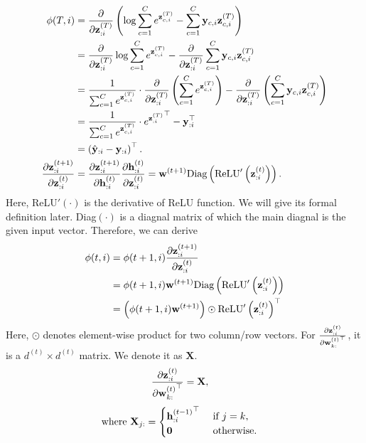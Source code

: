 \documentclass{article}
\begin{document}
\begin{align}
    \phi(T, i) &= {\frac{\partial}{\partial\mathbf{z}^{(T)}_{:i}}\left(\log{\sum_{c = 1}^{C}{e^{\mathbf{z}^{(T)}_{c, i}}}} - \sum_{c = 1}^{C}{\mathbf{y}_{c, i}\mathbf{z}^{(T)}_{c, i}}\right)} \notag \\
    &= {\frac{\partial}{\partial\mathbf{z}^{(T)}_{:i}}\log{\sum_{c = 1}^{C}{e^{\mathbf{z}^{(T)}_{c, i}}}}} - {\frac{\partial}{\partial\mathbf{z}^{(T)}_{:i}}\sum_{c = 1}^{C}{\mathbf{y}_{c, i}\mathbf{z}^{(T)}_{c, i}}} \notag \\
    &= \frac{1}{\sum_{c = 1}^{C}{e^{\mathbf{z}^{(T)}_{c, i}}}} \cdot \frac{\partial}{\partial\mathbf{z}^{(T)}_{:i}}\left(\sum_{c = 1}^{C}{e^{\mathbf{z}^{(T)}_{c, i}}}\right) - {\frac{\partial}{\partial\mathbf{z}^{(T)}_{:i}}\left(\sum_{c = 1}^{C}{\mathbf{y}_{c, i}\mathbf{z}^{(T)}_{c, i}}\right)} \notag \\
    &= \frac{1}{\sum_{c = 1}^{C}{e^{\mathbf{z}^{(T)}_{c, i}}}} \cdot {e^{\mathbf{z}^{(T)}_{:i}}}^\top - \mathbf{y}_{:i}^\top \notag \\
    &= \left(\hat{\mathbf{y}}_{:i} - \mathbf{y}_{:i}\right)^\top. \notag \\
    \frac{\partial\mathbf{z}^{(t + 1)}_{:i}}{\partial\mathbf{z}^{(t)}_{:i}} &= \frac{\partial\mathbf{z}^{(t + 1)}_{:i}}{\partial\mathbf{h}^{(t)}_{:i}}\frac{\partial\mathbf{h}^{(t)}_{:i}}{\partial\mathbf{z}^{(t)}_{:i}} = \mathbf{w}^{(t + 1)}\text{Diag}\left(\text{ReLU}'\left(\mathbf{z}^{(t)}_{:i}\right)\right). \notag
\end{align}
Here, ReLU$'(\cdot)$ is the derivative of ReLU function. We will give its formal definition later. Diag$(\cdot)$ is a diagnal matrix of which the main diagnal is the given input vector. Therefore, we can derive
\begin{align}
    \phi(t, i) &= \phi(t + 1, i)\frac{\partial\mathbf{z}^{(t + 1)}_{:i}}{\partial\mathbf{z}^{(t)}_{:i}} \notag \\
    &= \phi(t + 1, i)\mathbf{w}^{(t + 1)}\text{Diag}\left(\text{ReLU}'\left(\mathbf{z}^{(t)}_{:i}\right)\right) \notag \\
    &= \left(\phi(t + 1, i)\mathbf{w}^{(t + 1)}\right) \odot \text{ReLU}'\left(\mathbf{z}^{(t)}_{:i}\right)^\top \notag
\end{align}
Here, $\odot$ denotes element-wise product for two column/row vectors. For $\frac{\partial\mathbf{z}^{(t)}_{:i}}{\partial{\mathbf{w}^{(t)}_{k:}}^\top}$, it is a $d^{(t)} \times d^{(t)}$ matrix. We denote it as $\mathbf{X}$.
\begin{align}
    \frac{\partial\mathbf{z}^{(t)}_{:i}}{\partial{\mathbf{w}^{(t)}_{k:}}^\top} &= \mathbf{X}, \notag
\end{align}
\begin{align}
    \text{where}~\mathbf{X}_{j:} &= \begin{cases}
        {\mathbf{h}^{(t - 1)}_{:i}}^\top &~\text{if}~j = k, \\
        \mathbf{0} &~\text{otherwise}.
    \end{cases} \notag
\end{align}
\end{document}
